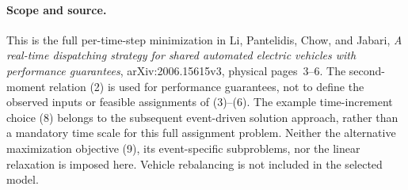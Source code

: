 \documentclass{article}
\begin{document}
\paragraph{Scope and source.}
This is the full per-time-step minimization in Li, Pantelidis, Chow, and Jabari, \emph{A real-time dispatching strategy for shared automated electric vehicles with performance guarantees}, arXiv:2006.15615v3, physical pages~3--6. The second-moment relation (2) is used for performance guarantees, not to define the observed inputs or feasible assignments of (3)--(6). The example time-increment choice (8) belongs to the subsequent event-driven solution approach, rather than a mandatory time scale for this full assignment problem. Neither the alternative maximization objective (9), its event-specific subproblems, nor the linear relaxation is imposed here. Vehicle rebalancing is not included in the selected model.
\end{document}
